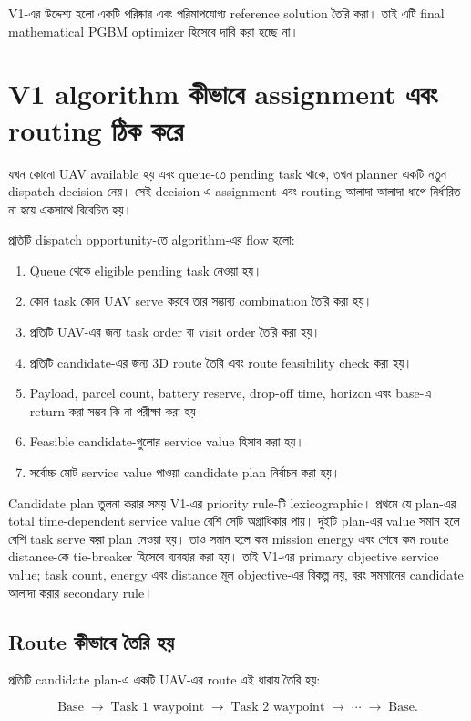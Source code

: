 \documentclass[10pt,a4paper]{article}
\begin{document}
V1-এর উদ্দেশ্য হলো একটি পরিষ্কার এবং পরিমাপযোগ্য reference solution তৈরি করা। তাই এটি final mathematical PGBM optimizer হিসেবে দাবি করা হচ্ছে না।

\section{V1 algorithm কীভাবে assignment এবং routing ঠিক করে}

যখন কোনো UAV available হয় এবং queue-তে pending task থাকে, তখন planner একটি নতুন dispatch decision নেয়। সেই decision-এ assignment এবং routing আলাদা আলাদা ধাপে নির্ধারিত না হয়ে একসাথে বিবেচিত হয়।

প্রতিটি dispatch opportunity-তে algorithm-এর flow হলো:

\begin{enumerate}
\item Queue থেকে eligible pending task নেওয়া হয়।
\item কোন task কোন UAV serve করবে তার সম্ভাব্য combination তৈরি করা হয়।
\item প্রতিটি UAV-এর জন্য task order বা visit order তৈরি করা হয়।
\item প্রতিটি candidate-এর জন্য 3D route তৈরি এবং route feasibility check করা হয়।
\item Payload, parcel count, battery reserve, drop-off time, horizon এবং base-এ return করা সম্ভব কি না পরীক্ষা করা হয়।
\item Feasible candidate-গুলোর service value হিসাব করা হয়।
\item সর্বোচ্চ মোট service value পাওয়া candidate plan নির্বাচন করা হয়।
\end{enumerate}

Candidate plan তুলনা করার সময় V1-এর priority rule-টি lexicographic। প্রথমে
যে plan-এর total time-dependent service value বেশি সেটি অগ্রাধিকার পায়। দুইটি
plan-এর value সমান হলে বেশি task serve করা plan নেওয়া হয়। তাও সমান হলে কম
mission energy এবং শেষে কম route distance-কে tie-breaker হিসেবে ব্যবহার করা
হয়। তাই V1-এর primary objective service value; task count, energy এবং distance
মূল objective-এর বিকল্প নয়, বরং সমমানের candidate আলাদা করার secondary rule।

\subsection{Route কীভাবে তৈরি হয়}

প্রতিটি candidate plan-এ একটি UAV-এর route এই ধারায় তৈরি হয়:

\begin{equation*}
\text{Base} \;\rightarrow\; \text{Task 1 waypoint} \;\rightarrow\; \text{Task 2 waypoint} \;\rightarrow\; \cdots \;\rightarrow\; \text{Base}.
\end{equation*}
\end{document}
